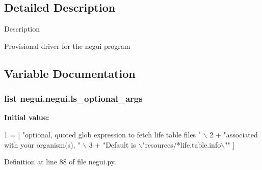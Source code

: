 \subsection{Detailed Description}
\begin{DoxyVerb}Description

Provisional driver for the negui program
\end{DoxyVerb}
 

\subsection{Variable Documentation}
\subsubsection[{\texorpdfstring{ls\+\_\+optional\+\_\+args}{ls_optional_args}}]{\setlength{\rightskip}{0pt plus 5cm}list negui.\+negui.\+ls\+\_\+optional\+\_\+args}\hypertarget{namespacenegui_1_1negui_a0e9000340ecb28a76174866dbd51c619}{}\label{namespacenegui_1_1negui_a0e9000340ecb28a76174866dbd51c619}
{\bfseries Initial value\+:}
\begin{DoxyCode}
1 = [ \textcolor{stringliteral}{"optional, quoted glob expression to fetch life table files "} \(\backslash\)
2             + \textcolor{stringliteral}{"associated with your organism(s), "} \(\backslash\)
3             + \textcolor{stringliteral}{"Default is \(\backslash\)"resources/*life.table.info\(\backslash\)""} ]
\end{DoxyCode}


Definition at line 88 of file negui.\+py.

